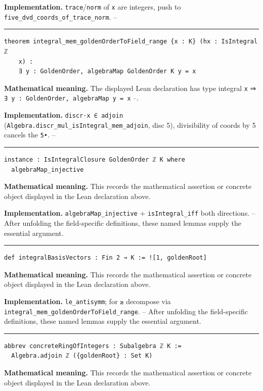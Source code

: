 \documentclass[UTF8,a4paper,11pt,fontset=fandol]{ctexart}
\theoremstyle{definition}
\newcommand{\statementsep}{\par\medskip\hrule\medskip}
\begin{document}
\noindent\textbf{Implementation.} \texttt{trace}/\texttt{norm} of \texttt{x} are integers, push to \texttt{five\_\allowbreak{}dvd\_\allowbreak{}coords\_\allowbreak{}of\_\allowbreak{}trace\_\allowbreak{}norm}. --\par
\statementsep
\begin{verbatim}
theorem integral_mem_goldenOrderToField_range {x : K} (hx : IsIntegral ℤ
    x) :
    ∃ y : GoldenOrder, algebraMap GoldenOrder K y = x
\end{verbatim}
\noindent\textbf{Mathematical meaning.} The displayed Lean declaration has type integral \texttt{x} ⇒ \texttt{∃ y : GoldenOrder, algebraMap y = x} --.\par
\noindent\textbf{Implementation.} \texttt{discr·x ∈ adjoin} (\texttt{Algebra.\allowbreak{}discr\_\allowbreak{}mul\_\allowbreak{}isIntegral\_\allowbreak{}mem\_\allowbreak{}adjoin}, disc 5), divisibility of coords by 5 cancels the \texttt{5•}. --\par
\statementsep
\begin{verbatim}
instance : IsIntegralClosure GoldenOrder ℤ K where
  algebraMap_injective
\end{verbatim}
\noindent\textbf{Mathematical meaning.} This records the mathematical assertion or concrete object displayed in the Lean declaration above.\par
\noindent\textbf{Implementation.} \texttt{algebraMap\_\allowbreak{}injective} + \texttt{isIntegral\_\allowbreak{}iff} both directions. -- After unfolding the field-specific definitions, these named lemmas supply the essential argument.\par
\statementsep
\begin{verbatim}
def integralBasisVectors : Fin 2 → K := ![1, goldenRoot]
\end{verbatim}
\noindent\textbf{Mathematical meaning.} This records the mathematical assertion or concrete object displayed in the Lean declaration above.\par
\noindent\textbf{Implementation.} \texttt{le\_\allowbreak{}antisymm}; for \texttt{≥} decompose via \texttt{integral\_\allowbreak{}mem\_\allowbreak{}goldenOrderToField\_\allowbreak{}range}. -- After unfolding the field-specific definitions, these named lemmas supply the essential argument.\par
\statementsep
\begin{verbatim}
abbrev concreteRingOfIntegers : Subalgebra ℤ K :=
  Algebra.adjoin ℤ ({goldenRoot} : Set K)
\end{verbatim}
\noindent\textbf{Mathematical meaning.} This records the mathematical assertion or concrete object displayed in the Lean declaration above.\par
\end{document}
